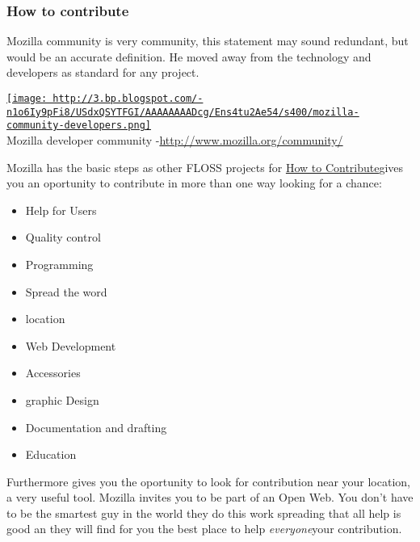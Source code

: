 \subsubsection{ How to contribute} Mozilla community is very community, this statement may sound redundant, but would be an accurate definition. He moved away from the technology and developers as standard for any project.
\\
\begin{tabular}\href{http://3.bp.blogspot.com/-n1o6Iy9pFi8/USdxQSYTFGI/AAAAAAAADcg/Ens4tu2Ae54/s1600/mozilla-community-developers.png}{
\texttt{[image: http://3.bp.blogspot.com/-n1o6Iy9pFi8/USdxQSYTFGI/AAAAAAAADcg/Ens4tu2Ae54/s400/mozilla-community-developers.png]}} \\ 
Mozilla developer community -\nolinebreak\href{http://www.mozilla.org/community/#hacks}{http://www.mozilla.org/community/}
\end{tabular} Mozilla has the basic steps as other FLOSS projects for \href{http://www.mozilla.org/es-ES/contribute/}{How to Contribute}\nolinebreakand gives you an oportunity to contribute in more than one way looking for a chance:
\\
\begin{itemize}
	\item Help for Users
	\item Quality control
	\item Programming
	\item Spread the word
	\item location
	\item Web Development
	\item Accessories
	\item graphic Design
	\item Documentation and drafting
	\item Education
\end{itemize} Furthermore gives you the oportunity to look for contribution near your location, a very useful tool. Mozilla invites you to be part of an Open Web. You don't have to be the smartest guy in the world they do this work spreading that all help is good an they will find for you the best place to help \textit{everyone}\nolinebreakwith your contribution.